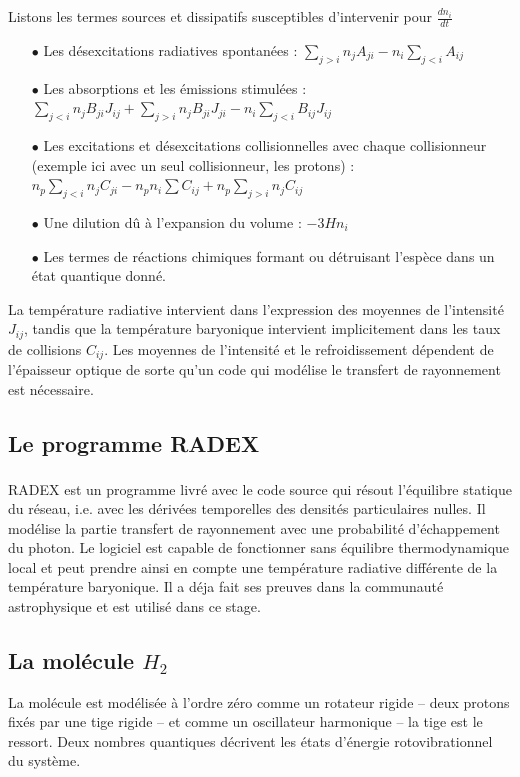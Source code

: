 \documentclass[10pt, a4paper]{report}
\numberwithin{equation}{subsection}
\begin{document}
Listons les termes sources et dissipatifs susceptibles d'intervenir pour $\frac{dn_i}{dt}$ \\

\begin{itemize}
	\item [$\bullet$] Les désexcitations radiatives spontanées : $\sum\limits_{j>i} n_jA_{ji}-n_i\sum\limits_{j<i} A_{ij}$
	\item [$\bullet$] Les absorptions et les émissions stimulées : $\sum\limits_{j<i} n_jB_{ji}J_{ij}+\sum\limits_{j>i} n_jB_{ji}J_{ji}-n_i\sum\limits_{j<i}B_{ij}J_{ij}$
	\item [$\bullet$] Les excitations et désexcitations collisionnelles avec chaque collisionneur (exemple ici avec un seul collisionneur, les protons) : $n_p\sum\limits_{j<i}n_j C_{ji}-n_pn_i\sum\limits C_{ij}+n_p\sum\limits_{j>i}n_j C_{ij}$
	\item [$\bullet$] Une dilution dû à l'expansion du volume : $-3Hn_i$\\
	\item [$\bullet$] Les termes de réactions chimiques formant ou détruisant l'espèce dans un état quantique donné.
\end{itemize}
\medskip
\normalsize
La température radiative intervient dans l'expression des moyennes de l'intensité $J_{ij}$, tandis que la température baryonique intervient implicitement dans les taux de collisions $C_{ij}$. Les moyennes de l'intensité et le refroidissement dépendent de l'épaisseur optique de sorte qu'un code qui modélise le transfert de rayonnement est nécessaire. 
\bigskip
\large 
\subsection{Le programme RADEX}
RADEX\textsuperscript{\cite{RADEX}} est un programme livré avec le code source qui résout l'équilibre statique du réseau, i.e. avec les dérivées temporelles des densités particulaires nulles. Il modélise la partie transfert de rayonnement avec une probabilité d'échappement du photon. Le logiciel est capable de fonctionner sans équilibre thermodynamique local et peut prendre ainsi en compte une température radiative différente de la température baryonique. Il a déja fait ses preuves dans la communauté astrophysique et est utilisé dans ce stage.
\subsection{La molécule $H_2$}
La molécule est modélisée à l'ordre zéro comme un rotateur rigide -- deux protons fixés par une tige rigide -- et comme un oscillateur harmonique -- la tige est le ressort. Deux nombres quantiques décrivent les états d'énergie rotovibrationnel du système.  
\end{document}
